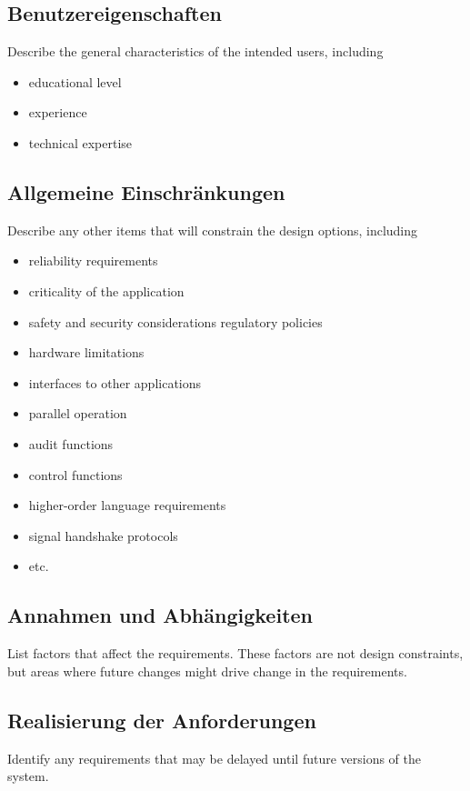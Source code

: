 \subsection{Benutzereigenschaften}
Describe the general characteristics of the intended users, including
\begin{itemize}
	\item educational level
	\item experience
	\item technical expertise
\end{itemize}

\subsection{Allgemeine Einschränkungen}
Describe any other items that will constrain the design options, including
\begin{itemize}
	\item reliability requirements
	\item criticality of the application
	\item safety and security considerations regulatory policies
	\item hardware limitations
	\item interfaces to other applications
	\item parallel operation
	\item audit functions
	\item control functions
	\item higher-order language requirements
	\item signal handshake protocols
	\item etc.
\end{itemize}

\subsection{Annahmen und Abhängigkeiten}
List factors that affect the requirements. These factors are not design constraints, but areas where future changes might drive change in the requirements.

\subsection{Realisierung der Anforderungen}
Identify any requirements that may be delayed until future versions of the system.

\newpage

